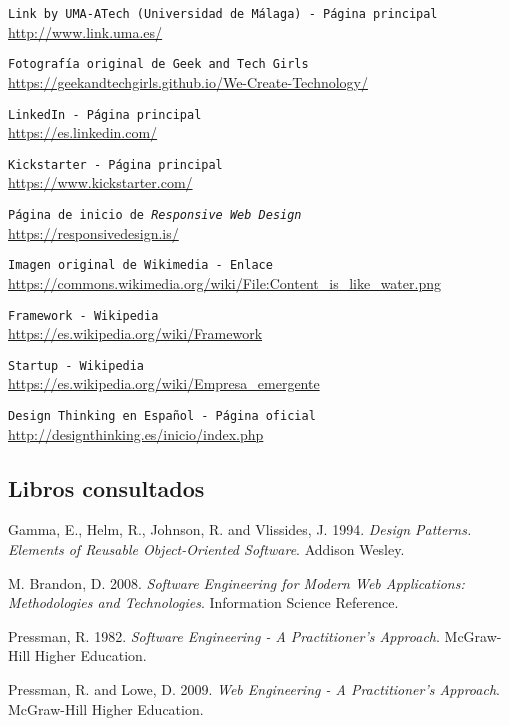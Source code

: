  {\tt Link by UMA-ATech (Universidad de Málaga) - Página principal}\\
\url{http://www.link.uma.es/}

 {\tt Fotografía original de Geek and Tech Girls}\\
\url{https://geekandtechgirls.github.io/We-Create-Technology/}

 {\tt LinkedIn - Página principal}\\
\url{https://es.linkedin.com/}

 {\tt Kickstarter - Página principal}\\
\url{https://www.kickstarter.com/}

 {\tt Página de inicio de \textit{Responsive Web Design}}\\
\url{https://responsivedesign.is/}

 {\tt Imagen original de Wikimedia - Enlace}\\
\url{https://commons.wikimedia.org/wiki/File:Content_is_like_water.png}

 {\tt Framework - Wikipedia}\\
\url{https://es.wikipedia.org/wiki/Framework}

 {\tt Startup - Wikipedia}\\
\url{https://es.wikipedia.org/wiki/Empresa_emergente}

 {\tt Design Thinking en Español - Página oficial}\\
\url{http://designthinking.es/inicio/index.php}

\subsection*{Libros consultados}

Gamma, E., Helm, R., Johnson, R. and Vlissides, J. 1994. {\em Design Patterns. Elements of Reusable Object-Oriented Software}. Addison Wesley.

M. Brandon, D. 2008. {\em Software Engineering for Modern Web Applications: Methodologies and Technologies}. Information Science Reference.

Pressman, R. 1982. {\em Software Engineering - A Practitioner's Approach}. McGraw-Hill Higher Education.

Pressman, R. and Lowe, D. 2009. {\em Web Engineering - A Practitioner's Approach}. McGraw-Hill Higher Education.

